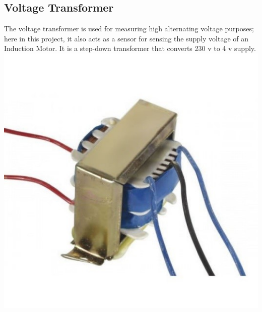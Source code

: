\subsection{Voltage Transformer}
The voltage transformer is used for measuring high alternating voltage purposes; here in this project, it also acts as a sensor for sensing the supply voltage of an Induction Motor. It is a step-down transformer that converts 230 v to 4 v supply.\\
{\includegraphics[height=0.2\textheight]{Figures/volt.jpg}}
